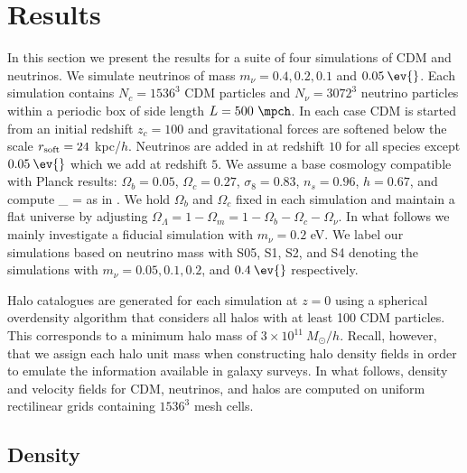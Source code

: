   
\section{Results}
\label{sec:nu-results}

In this section we present the results for a suite of four simulations of CDM and neutrinos.  We simulate neutrinos of mass $m_\nu = 0.4, 0.2, 0.1$ and $0.05\:\ev{}$.  Each simulation contains $N_c = 1536^3$ CDM particles and $N_\nu = 3072^3$ neutrino particles within a periodic box of side length $L = 500\ \mpch$. In each case CDM is started from an initial redshift $z_c = 100$ and gravitational forces are softened below the scale $r_{\rm soft} = 24$ kpc/$h$.  Neutrinos are added in at redshift $10$ for all species except $0.05\:\ev{}$ which we add at redshift $5$.  We assume a base cosmology compatible with Planck results: $\Omega_b = 0.05$, $\Omega_c = 0.27$, $\sigma_8 = 0.83$, $n_s = 0.96$, $h = 0.67$, and compute
\bq
\Omega_{\nu} = 
\label{eq:omnu}
\eq
as in \citet{mangano/etal:2015}. We hold $\Omega_b$ and $\Omega_c$ fixed in each simulation and maintain a flat universe by adjusting $\Omega_\Lambda = 1 - \Omega_m = 1 - \Omega_b - \Omega_c - \Omega_\nu$. In what follows we mainly investigate a fiducial simulation with $m_\nu = 0.2$ eV.  We label our simulations based on neutrino mass with S05, S1, S2, and S4 denoting the simulations with $m_\nu = 0.05, 0.1, 0.2$, and $0.4\:\ev{}$ respectively.  

Halo catalogues are generated for each simulation at $z = 0$ using a spherical overdensity algorithm that considers all halos with at least 100 CDM particles. This corresponds to a minimum halo mass of $3 \times 10^{11}\ M_\odot/h$. Recall, however, that we assign each halo unit mass when constructing halo density fields in order to emulate the information available in galaxy surveys. In what follows, density and velocity fields for CDM, neutrinos, and halos are computed on uniform rectilinear grids containing $1536^3$ mesh cells.  
    
\subsection{Density}
\label{ssec:density}

